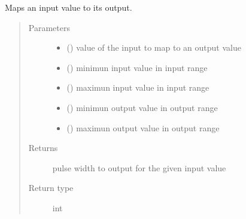 \documentclass[letterpaper,10pt,english]{sphinxmanual}
\begin{document}
\begin{fulllineitems}

\begin{fulllineitems}
\label{\detokenize{specific:SideLipOutput.SideLipOutput.map_values}}
\sphinxAtStartPar
Maps an input value to its output.
\begin{quote}\begin{description}
\item[{Parameters}] \leavevmode\begin{itemize}
\item {} 
\sphinxAtStartPar
{} () \textendash{} value of the input to map to an output value

\item {} 
\sphinxAtStartPar
{} () \textendash{} minimun input value in input range

\item {} 
\sphinxAtStartPar
{} () \textendash{} maximun input value in input range

\item {} 
\sphinxAtStartPar
{} () \textendash{} minimun output value in output range

\item {} 
\sphinxAtStartPar
{} () \textendash{} maximun output value in output range

\end{itemize}

\item[{Returns}] \leavevmode
\sphinxAtStartPar
pulse width to output for the given input value

\item[{Return type}] \leavevmode
\sphinxAtStartPar
int

\end{description}\end{quote}


\end{fulllineitems}
\end{fulllineitems}
\end{document}
